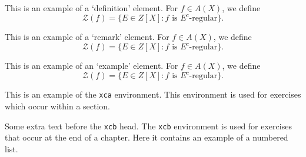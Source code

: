 \begin{definition}
This is an example of a `definition' element.
For $f\in A(X)$, we define
\begin{equation}
\mathcal{Z} (f)=\{E\in Z[X]: \text{$f$ is $E^c$-regular}\}.
\end{equation}
\end{definition}

\begin{remark}
This is an example of a `remark' element.
For $f\in A(X)$, we define
\begin{equation}
\mathcal{Z} (f)=\{E\in Z[X]: \text{$f$ is $E^c$-regular}\}.
\end{equation}
\end{remark}

\begin{example}
This is an example of an `example' element.
For $f\in A(X)$, we define
\begin{equation}
\mathcal{Z} (f)=\{E\in Z[X]: \text{$f$ is $E^c$-regular}\}.
\end{equation}
\end{example}

\begin{xca}
This is an example of the \texttt{xca} environment. This environment is
used for exercises which occur within a section.
\end{xca}

Some extra text before the \texttt{xcb} head. The \texttt{xcb} environment
is used for exercises that occur at the end of a chapter.  Here it contains
an example of a numbered list.

